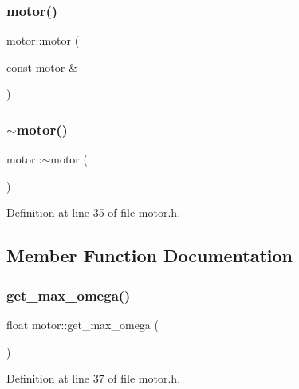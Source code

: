 \subsubsection{\texorpdfstring{motor()}{motor()}\hspace{0.1cm}{\footnotesize\ttfamily [4/4]}}
{\footnotesize\ttfamily motor\+::motor (\begin{DoxyParamCaption}\item[{const \mbox{\hyperlink{classmotor}{motor}} \&}]{ }\end{DoxyParamCaption})\hspace{0.3cm}{\ttfamily [default]}}

\mbox{\label{classmotor_ae7c05cf12983ab16ecdfe8e34c4c7ffa}} 
\subsubsection{\texorpdfstring{$\sim$motor()}{~motor()}}
{\footnotesize\ttfamily motor\+::$\sim$motor (\begin{DoxyParamCaption}{ }\end{DoxyParamCaption})\hspace{0.3cm}{\ttfamily [inline]}}



Definition at line 35 of file motor.\+h.



\subsection{Member Function Documentation}
\mbox{\label{classmotor_a9c5b147bc6f5cc68d15286e4740a1e59}} 
\subsubsection{\texorpdfstring{get\_max\_omega()}{get\_max\_omega()}}
{\footnotesize\ttfamily float motor\+::get\+\_\+max\+\_\+omega (\begin{DoxyParamCaption}{ }\end{DoxyParamCaption})\hspace{0.3cm}{\ttfamily [inline]}}



Definition at line 37 of file motor.\+h.

